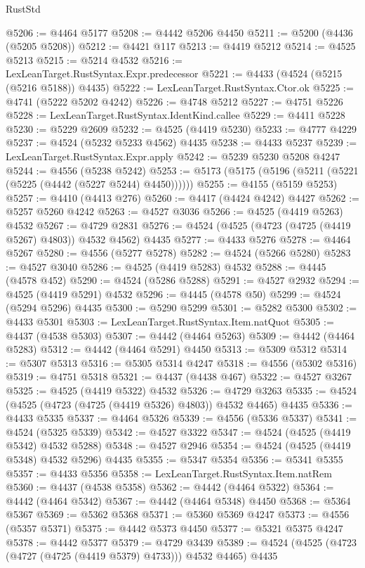 \begin{lexlean}{RustStd}
\begin{coremodule}
@5206 := @4464 @5177
@5208 := @4442 @5206 @4450
@5211 := @5200 (@4436 (@5205 @5208))
@5212 := @4421 @117
@5213 := @4419 @5212
@5214 := @4525 @5213
@5215 := @5214 @4532
@5216 := LexLeanTarget.RustSyntax.Expr.predecessor
@5221 := @4433 (@4524 (@5215 (@5216 @5188)) @4435)
@5222 := LexLeanTarget.RustSyntax.Ctor.ok
@5225 := @4741 (@5222 @5202 @4242)
@5226 := @4748 @5212
@5227 := @4751 @5226
@5228 := LexLeanTarget.RustSyntax.IdentKind.callee
@5229 := @4411 @5228
@5230 := @5229 @2609
@5232 := @4525 (@4419 @5230)
@5233 := @4777 @4229
@5237 := @4524 (@5232 @5233 @4562) @4435
@5238 := @4433 @5237
@5239 := LexLeanTarget.RustSyntax.Expr.apply
@5242 := @5239 @5230 @5208 @4247
@5244 := @4556 (@5238 @5242)
@5253 := @5173 (@5175 (@5196 (@5211 (@5221 (@5225 (@4442 (@5227 @5244) @4450))))))
@5255 := @4155 (@5159 @5253)
@5257 := @4410 (@4413 @276)
@5260 := @4417 (@4424 @4242) @4427
@5262 := @5257 @5260 @4242
@5263 := @4527 @3036
@5266 := @4525 (@4419 @5263) @4532
@5267 := @4729 @2831
@5276 := @4524 (@4525 (@4723 (@4725 (@4419 @5267) @4803)) @4532 @4562) @4435
@5277 := @4433 @5276
@5278 := @4464 @5267
@5280 := @4556 (@5277 @5278)
@5282 := @4524 (@5266 @5280)
@5283 := @4527 @3040
@5286 := @4525 (@4419 @5283) @4532
@5288 := @4445 (@4578 @452)
@5290 := @4524 (@5286 @5288)
@5291 := @4527 @2932
@5294 := @4525 (@4419 @5291) @4532
@5296 := @4445 (@4578 @50)
@5299 := @4524 (@5294 @5296) @4435
@5300 := @5290 @5299
@5301 := @5282 @5300
@5302 := @4433 @5301
@5303 := LexLeanTarget.RustSyntax.Item.natQuot
@5305 := @4437 (@4538 @5303)
@5307 := @4442 (@4464 @5263)
@5309 := @4442 (@4464 @5283)
@5312 := @4442 (@4464 @5291) @4450
@5313 := @5309 @5312
@5314 := @5307 @5313
@5316 := @5305 @5314 @4247
@5318 := @4556 (@5302 @5316)
@5319 := @4751 @5318
@5321 := @4437 (@4438 @467)
@5322 := @4527 @3267
@5325 := @4525 (@4419 @5322) @4532
@5326 := @4729 @3263
@5335 := @4524 (@4525 (@4723 (@4725 (@4419 @5326) @4803)) @4532 @4465) @4435
@5336 := @4433 @5335
@5337 := @4464 @5326
@5339 := @4556 (@5336 @5337)
@5341 := @4524 (@5325 @5339)
@5342 := @4527 @3322
@5347 := @4524 (@4525 (@4419 @5342) @4532 @5288)
@5348 := @4527 @2946
@5354 := @4524 (@4525 (@4419 @5348) @4532 @5296) @4435
@5355 := @5347 @5354
@5356 := @5341 @5355
@5357 := @4433 @5356
@5358 := LexLeanTarget.RustSyntax.Item.natRem
@5360 := @4437 (@4538 @5358)
@5362 := @4442 (@4464 @5322)
@5364 := @4442 (@4464 @5342)
@5367 := @4442 (@4464 @5348) @4450
@5368 := @5364 @5367
@5369 := @5362 @5368
@5371 := @5360 @5369 @4247
@5373 := @4556 (@5357 @5371)
@5375 := @4442 @5373 @4450
@5377 := @5321 @5375 @4247
@5378 := @4442 @5377
@5379 := @4729 @3439
@5389 := @4524 (@4525 (@4723 (@4727 (@4725 (@4419 @5379) @4733))) @4532 @4465) @4435

\end{coremodule}
\end{lexlean}

